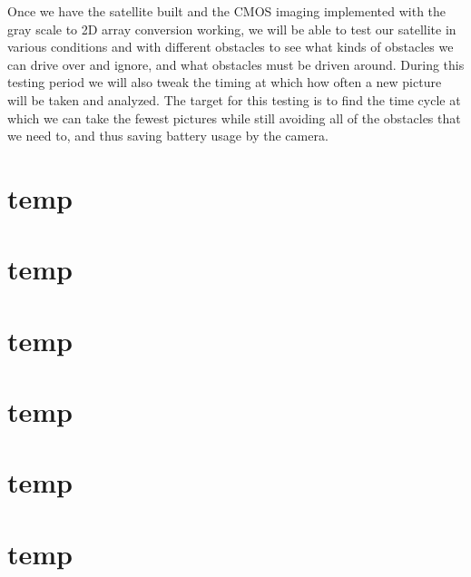 \documentclass[10pt,letterpaper,onecolumn,journal]{IEEEtran}
\begin{document}
\par
Once we have the satellite built and the CMOS imaging implemented with the gray scale to 2D array conversion working, we will be able to test our satellite in various conditions and with different obstacles to see what kinds of obstacles we can drive over and ignore, and what obstacles must be driven around. During this testing period we will also tweak the timing at which how often a new picture will be taken and analyzed. The target for this testing is to find the time cycle at which we can take the fewest pictures while still avoiding all of the obstacles that we need to, and thus saving battery usage by the camera.
\section{temp}

\section{temp}

\section{temp}

\section{temp}

\section{temp}

\section{temp}


\clearpage
{}


\end{document}
